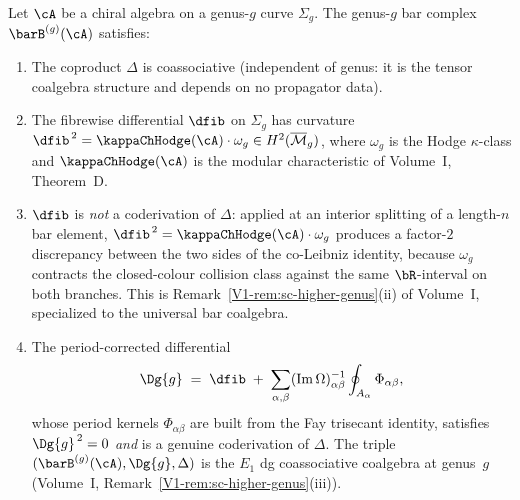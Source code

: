 \begin{proposition}
\label{prop:curved-R-factorization}
Let $\cA$ be a chiral algebra on a genus-$g$ curve $\Sigma_g$.
The genus-$g$ bar complex $\barB^{(g)}(\cA)$ satisfies:
\begin{enumerate}[label=\textup{(\roman*)}]
\item The coproduct $\Delta$ is coassociative
 (independent of genus: it is the tensor coalgebra structure
 and depends on no propagator data).
\item The fibrewise differential $\dfib$ on $\Sigma_g$ has
 curvature
 $\dfib^{\,2} = \kappaChHodge(\cA) \cdot \omega_g \in
 H^{2}(\overline{\mathcal{M}}_g)$, where $\omega_g$ is the
 Hodge $\kappa$-class and $\kappaChHodge(\cA)$ is the modular
 characteristic of Volume~I, Theorem~D.
\item $\dfib$ is \emph{not} a coderivation of $\Delta$:
 applied at an interior splitting of a length-$n$ bar element,
 $\dfib^{\,2} = \kappaChHodge(\cA)\cdot\omega_g$ produces a factor-$2$
 discrepancy between the two sides of the co-Leibniz identity,
 because $\omega_g$ contracts the closed-colour collision
 class against the same $\bR$-interval on both branches.
 This is Remark~\ref{V1-rem:sc-higher-genus}\textup{(ii)} of
 Volume~I, specialized to the universal bar coalgebra.
\item The period-corrected differential
 \[
 \Dg{g}
 \;=\;
 \dfib \;+\;
 \sum_{\alpha,\beta}
 (\operatorname{Im}\Omega)^{-1}_{\alpha\beta}
 \oint_{A_\alpha} \Phi_{\alpha\beta},
 \]
 whose period kernels $\Phi_{\alpha\beta}$ are built from the
 Fay trisecant identity, satisfies
 $\Dg{g}^{\,2} = 0$ \emph{and} is a genuine coderivation of
 $\Delta$. The triple $(\barB^{(g)}(\cA), \Dg{g}, \Delta)$ is
 the $E_1$ dg coassociative coalgebra at genus~$g$
 (Volume~I, Remark~\ref{V1-rem:sc-higher-genus}\textup{(iii)}).
\end{enumerate}
\end{proposition}

